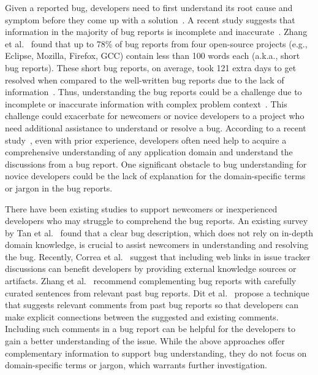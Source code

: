 Given a reported bug, developers need to first understand its root cause and symptom before they come up with a solution~\cite{bohme2017directed}. A recent study suggests that information in the majority of bug reports is incomplete and inaccurate~\cite{davies2014s,bugde2008global}. Zhang et al.~\cite{zhang2017bug} found that up to 78\% of bug reports from four open-source projects (e.g., Eclipse, Mozilla, Firefox, GCC) contain less than 100 words each (a.k.a., short bug reports). These short bug reports, on average, took 121 extra days to get resolved when compared to the well-written bug reports due to the lack of information~\cite{zhang2017bug}. Thus, understanding the bug reports could be a challenge due to incomplete or inaccurate information with complex problem context~\cite{velly2013towards}. This challenge could exacerbate for newcomers or novice developers to a project who need additional assistance to understand or resolve a bug. According to a recent study~\cite{guizani2021long}, even with prior experience, developers often need help to acquire a comprehensive understanding of any application domain and understand the discussions from a bug report. One significant obstacle to bug understanding for novice developers could be the lack of explanation for the domain-specific terms or jargon in the bug reports.\par

There have been existing studies to support newcomers or inexperienced developers who may struggle to comprehend the bug reports. An existing survey by Tan et al.~\cite{tan2020first} found that a clear bug description, which does not rely on in-depth domain knowledge, is crucial to assist newcomers in understanding and resolving the bug. Recently, Correa et al.~\cite{correa2013samekana} suggest that including web links in issue tracker discussions can benefit developers by providing external knowledge sources or artifacts. Zhang et al.~\cite{zhang2017bug} recommend complementing bug reports with carefully curated sentences from relevant past bug reports. Dit et al.~\cite{dit2008improving} propose a technique that suggests relevant comments from past bug reports so that developers can make explicit connections between the suggested and existing comments. Including such comments in a bug report can be helpful for the developers to gain a better understanding of the issue. While the above approaches offer complementary information to support bug understanding, they do not focus on domain-specific terms or jargon, which warrants further investigation.\par

